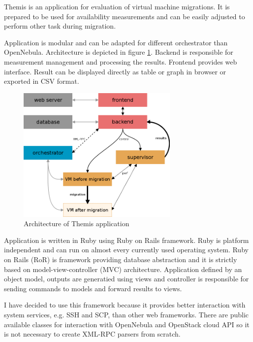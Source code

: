 
Themis is an application for evaluation of virtual machine migrations. It is prepared to be used for availability measurements and can be easily adjusted to perform other task during migration. 

Application is modular and can be adapted for different orchestrator than OpenNebula. Architecture is depicted in figure \ref{img:themis-model}. Backend is responsible for measurement management and processing the results. Frontend provides web interface. Result can be displayed directly as table or graph in browser or exported in \Ac{CSV} format.

\begin{figure}[htb]
	\begin{center}
	\includegraphics[width=0.7\textwidth]{themis-model.png}
	\end{center}
	\caption{Architecture of Themis application}
	\label{img:themis-model}
\end{figure}

Application is written in Ruby using Ruby on Rails framework. Ruby is platform independent and can run on almost every currently used operating system. Ruby on Rails (\Ac{RoR}) is framework providing database abstraction and it is strictly based on model-view-controller (\Ac{MVC}) architecture. Application defined by an object model, outputs are generatied using views and controller is responsible for sending commands to models and forward results to views.

I have decided to use this framework because it provides better interaction with system services, e.g. \Ac{SSH} and \Ac{SCP}, than other web frameworks. There are public available classes for interaction with OpenNebula and OpenStack cloud \Ac{API} so it is not necessary to create \mbox{\Ac{XML}-\Ac{RPC}} parsers from scratch.


